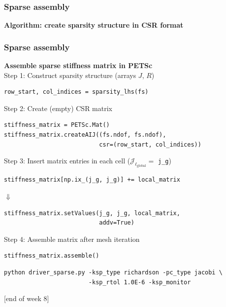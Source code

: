 \documentclass{beamer}
\begin{document}
\begin{frame}[fragile]
  \frametitle{Sparse assembly}
  \textbf{Algorithm: create sparsity structure in CSR format}
  \begin{algorithmic}[1]
\EndFor
\EndFor
{}
\EndFor
  \end{algorithmic}  
\end{frame}


\begin{frame}[fragile]
  \frametitle{Sparse assembly}
  \textbf{Assemble sparse stiffness matrix in PETSc}\\[1ex]
  Step 1: Construct sparsity structure (arrays $J$, $R$)
\begin{lstlisting}
row_start, col_indices = sparsity_lhs(fs)
\end{lstlisting}
  Step 2: Create (empty) CSR matrix
\begin{lstlisting}
stiffness_matrix = PETSc.Mat()
stiffness_matrix.createAIJ((fs.ndof, fs.ndof),
                           csr=(row_start, col_indices))     
\end{lstlisting}
Step 3: Insert matrix entries in each cell ($\mathcal{J}_{\ell_{\text{global}}}=$ \lstinline{j_g})
\begin{lstlisting}
stiffness_matrix[np.ix_(j_g, j_g)] += local_matrix  
\end{lstlisting}
{}\qquad\qquad$\Downarrow$
\begin{lstlisting}
stiffness_matrix.setValues(j_g, j_g, local_matrix,
                           addv=True)
\end{lstlisting}
Step 4: Assemble matrix after mesh iteration
\begin{lstlisting}
stiffness_matrix.assemble()  
\end{lstlisting}
{\footnotesize
\begin{verbatim}
python driver_sparse.py -ksp_type richardson -pc_type jacobi \
                        -ksp_rtol 1.0E-6 -ksp_monitor
\end{verbatim}}
{\begin{flushright} {\footnotesize [end of week 8]} \end{flushright}}
\end{frame}
\end{document}
